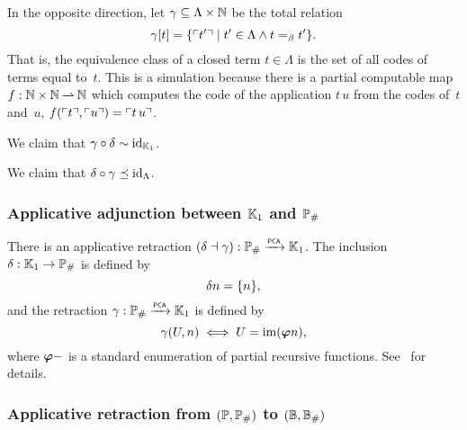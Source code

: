 In the opposite direction, let $\gamma \subseteq \Lambda \times \NN$ be the total relation
%
\begin{equation*}
  \gamma[t] = \set{ \code{t'} \such t' \in \Lambda \land t =_\beta t' }.
\end{equation*}
%
That is, the equivalence class of a closed term $t \in \Lambda$ is the set of all codes of terms equal to~$t$.
This is a simulation because there is a partial computable map~$f : \NN \times \NN \parto \NN$ which computes the code of the application $t \, u$ from the codes of~$t$ and~$u$,
%
$f(\code{t}, \code{u}) = \code{t \, u}$.

We claim that $\gamma \circ \delta \sim \id[\klone]$.

We claim that $\delta \circ \gamma \preceq \id[\Lambda]$.

\subsubsection{Applicative adjunction between $\klone$ and $\comp{\Scott}$}
\label{ex:pcamorphism_K1_RE}%

%
%

There is an applicative retraction $(\delta \dashv \gamma): \comp{\Scott}
\pcato \klone$. The inclusion $\delta: \klone \to \comp{\Scott}$ is defined
by
\begin{equation*}
  \delta n = \set{n},
\end{equation*}
and the retraction $\gamma: \comp{\Scott} \pcato \klone$ is defined by
\begin{equation*}
  \gamma(U, n)
  \iff
  U = \im{\xpr{n}},
\end{equation*}
where $\xpr{\place}$ is a standard enumeration of partial
recursive functions. See~\cite[Proposition 3.3.7]{Longley:94} for
details.




\subsubsection{Applicative retraction from $(\Scott, \comp{\Scott})$ to
  $(\Baire, \comp{\Baire})$}
\label{sec:applicative_retraction_PP_BB}%

